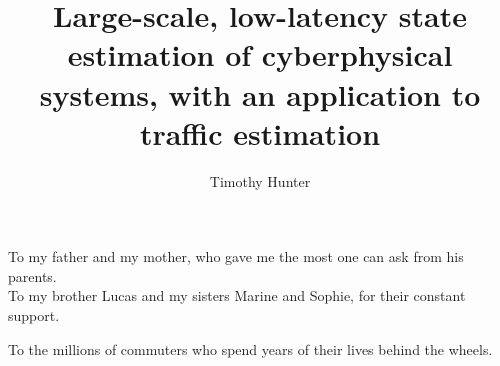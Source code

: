 \documentclass{ucbthesis}
\begin{document}

\title{Large-scale, low-latency state estimation of cyberphysical systems, with an application to traffic estimation}
\author{Timothy Hunter}




\maketitle
\approvalpage
\copyrightpage



\begin{frontmatter}

\begin{dedication}
\null\vfil
\begin{center}
To my father and my mother, who gave me the most one can ask from his parents.\\

To my brother Lucas and my sisters Marine and Sophie, for their constant support.\\\vspace{12pt}

To the millions of commuters who spend years of their lives behind the wheels.\\\vspace{12pt}
\end{center}
\vfil\null
\end{dedication}

\tableofcontents
\clearpage
\listoffigures
\clearpage
\listofalgorithms

\begin{acknowledgements}

\end{acknowledgements}

\end{frontmatter}
\end{document}
